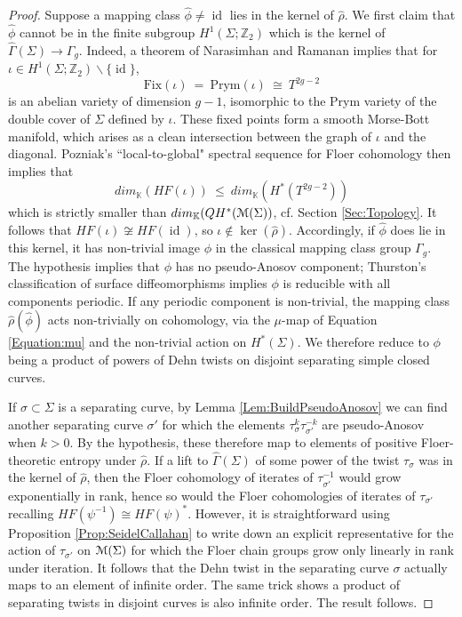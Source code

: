 \documentclass[reqno,10pt]{amsart}
\numberwithin{equation}{section}
\newcommand{\bK}{{\mathbb K}}
\newcommand{\bZ}{{\mathbb Z}}
\newcommand{\scrM}{\EuScript{M}}
\newcommand{\id}{\operatorname{id}}
\theoremstyle{remark}
\begin{document}
\begin{proof}
Suppose a mapping class $\hat\phi \neq \id$ lies in the kernel of $\hat\rho$. We first claim that $\hat\phi$ cannot be in the finite subgroup $H^1(\Sigma;\bZ_2)$ which is the kernel of $\widehat{\Gamma}(\Sigma) \rightarrow \Gamma_g$.   Indeed, a theorem of Narasimhan and Ramanan \cite{NR} implies that for $\iota \in H^1(\Sigma;\bZ_2) \backslash \{\id\}$, 
\[
\textrm{Fix}(\iota) \ =  \ \textrm{Prym}(\iota)\  \cong \ T^{2g-2} 
\]
is an abelian variety of dimension $g-1$, isomorphic to the Prym variety of the double cover of $\Sigma$ defined by $\iota$.  These fixed points form a smooth Morse-Bott manifold, which arises as a clean intersection between the graph of $\iota$ and the diagonal.  Pozniak's ``local-to-global" spectral sequence for Floer cohomology \cite{Pozniak} then implies that
\[
dim_{\bK}(HF(\iota)) \  \leq \ dim_{\bK}(H^*(T^{2g-2}))
\]
which is strictly smaller than $dim_{\bK}(QH^*(\scrM(\Sigma))$, cf. Section \ref{Sec:Topology}. It follows that $HF(\iota) \not\cong HF(\id)$, so $\iota \not\in \ker(\hat\rho)$.   Accordingly, if $\hat\phi$ does lie in this kernel, it has non-trivial image $\phi$ in the classical mapping class group $\Gamma_g$.  The hypothesis implies that $\phi$ has no pseudo-Anosov component;  Thurston's classification of surface diffeomorphisms \cite{FLP} implies $\phi$ is reducible with all components periodic.   If any periodic component  is non-trivial, the mapping class $\hat\rho(\hat\phi)$ acts non-trivially on cohomology, via the $\mu$-map of Equation \ref{Equation:mu} and the non-trivial action on $H^*(\Sigma)$. We therefore reduce to $\phi$ being a product of powers of Dehn twists on disjoint separating simple closed curves. 

If $\sigma\subset \Sigma$ is a separating curve, by Lemma \ref{Lem:BuildPseudoAnosov} we can find another separating curve $\sigma'$ for which the elements $\tau_{\sigma}^k \tau_{\sigma'}^{-k}$ are pseudo-Anosov when $k>0$. By the hypothesis,  these therefore map to elements of positive Floer-theoretic entropy under $\hat\rho$. If a lift to $\widehat{\Gamma}(\Sigma)$ of some power of the twist $\tau_{\sigma}$ was in the kernel of $\hat\rho$, then  the Floer cohomology of iterates of $\tau_{\sigma'}^{-1}$ would grow exponentially in rank, hence so would the Floer cohomologies of iterates of $\tau_{\sigma'}$ recalling $HF(\psi^{-1}) \cong HF(\psi)^*$.  However,  it is straightforward using Proposition \ref{Prop:SeidelCallahan} to write down an explicit representative for the action of $\tau_{\sigma'}$ on $\scrM(\Sigma)$  for which the Floer chain groups grow only linearly in rank under iteration. It follows that the Dehn twist in the separating curve $\sigma$ actually maps to an element of infinite order.  The same trick shows a product of separating twists in disjoint curves  is also infinite order.  The result follows.
\end{proof}
\end{document}
